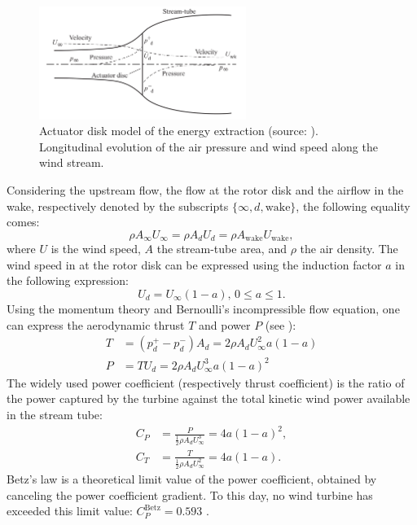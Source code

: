 \begin{figure}[!h]
    \centering
    \includegraphics[width=0.6\textwidth]{./part1/figures/actuator_disk.png}
    \caption{Actuator disk model of the energy extraction (source: \citealp{burton_2021_wind_handbook}). Longitudinal evolution of the air pressure and wind speed along the wind stream.}
    \label{fig:actuator_disk}
\end{figure}
Considering the upstream flow, the flow at the rotor disk and the airflow in the wake, respectively denoted by the subscripts $\{\infty, d, \mathrm{wake}\}$, the following equality comes:  
\begin{equation}
    \rho A_\infty U_\infty = \rho A_d U_d = \rho A_{\mathrm{wake}} U_{\mathrm{wake}},
\end{equation}
where $U$ is the wind speed, $A$ the stream-tube area, and $\rho$ the air density. 
The wind speed in at the rotor disk can be expressed using the induction factor $a$ in the following expression: 
\begin{equation}
    U_d = U_\infty (1 - a), \, 0\leq a \leq 1.
\end{equation}
Using the momentum theory and Bernoulli's incompressible flow equation, one can express the aerodynamic thrust $T$ and power $P$ (see \citealp{milano_thesis_2021}): 
\begin{subequations}
    \begin{align}
        T&=(p_d^+ - p_d^-) A_d = 2 \rho A_d U_\infty^2 a (1- a)\\
        P&= T U_d = 2 \rho A_d U_\infty^3 a (1- a)^2
    \end{align}
    \label{eq:momentum_theory}
\end{subequations}
The widely used power coefficient (respectively thrust coefficient) is the ratio of the power captured by the turbine against the total kinetic wind power available in the stream tube: 
\begin{subequations}
    \begin{align}
        C_P &= \frac{P}{\frac12 \rho A_d U_\infty^3} = 4a (1-a)^2,\\
        C_T &= \frac{T}{\frac12 \rho A_d U_\infty^2} = 4a (1-a). 
    \end{align}
\end{subequations} 
Betz's law is a theoretical limit value of the power coefficient, obtained by canceling the power coefficient gradient. 
To this day, no wind turbine has exceeded this limit value: $C_P^{\mathrm{Betz}} = 0.593$ \citep{burton_2021_wind_handbook}.  




